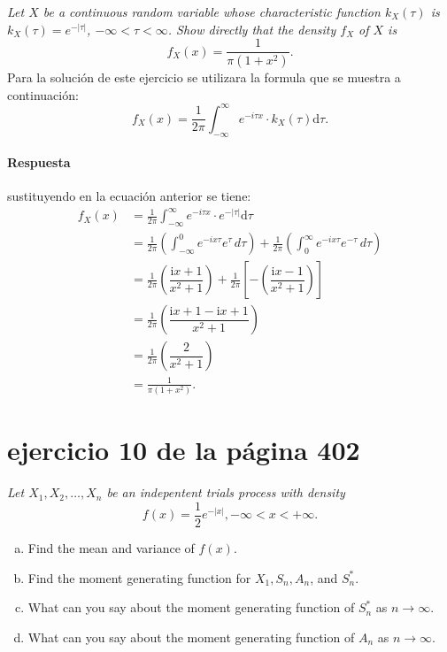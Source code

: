 \documentclass{article}
\begin{document}
\textit{Let $X$ be a continuous random variable whose characteristic function $k_X (\tau)$ is $k_X(\tau) = e^{-|\tau|}$, $-\infty < \tau < \infty$. Show directly that the density $f_X$ of $X$ is}
  \begin{equation*}
      f_X(x) = \frac{1}{\pi (1+x^2)}.
  \end{equation*}
Para la solución de este ejercicio se utilizara la formula que se muestra a continuación:
  \begin{equation}
      f_X(x) = \frac{1}{2\pi}\displaystyle\int_{-\infty}^\infty e^{-i\tau x}\cdot k_{X}(\tau)\mathrm{d}\tau .
  \end{equation}
\paragraph{Respuesta}  sustituyendo en la ecuación anterior se tiene: 
  \begin{align}
      f_X(x) &= \frac{1}{2\pi}\displaystyle\int_{-\infty}^\infty e^{-i\tau x}\cdot e^{-|\tau|}\mathrm{d}\tau \\ 
             &=\frac{1}{2\pi} \left( \int_{-\infty}^{0}e^{-ix\tau} e^{\tau}\, d\tau \right) + \frac{1}{2\pi} \left( \int_{0}^{\infty}e^{-ix\tau} e^{-\tau}\, d\tau \right)  \\
            &= \frac{1}{2\pi} \left(\dfrac{\mathrm{i}x+1}{x^2+1}\right)+\frac{1}{2\pi}\left[- \left(\dfrac{\mathrm{i}x-1}{x^2+1}\right)\right]\\
            &=\frac{1}{2\pi}\left( \dfrac{\mathrm{i}x+1 -\mathrm{i}x +1}{x^2+1} \right)\\
            &= \frac{1}{2\pi}\left( \dfrac{2}{x^2+1} \right)\\
            &= \frac{1}{\pi (1+x^2)}.
  \end{align}

\section{ejercicio 10 de la página 402}

  \textit{Let $X_1, X_2, \ldots, X_n$ be an indepentent trials process with density}
  \begin{equation*}
    f(x) = \frac{1}{2} e^{-|x|}, -\infty < x < + \infty.
  \end{equation*}
  \begin{enumerate}[a)]
    \item Find the mean and variance of $f(x)$.
    \item Find the moment generating function for $X_1, S_n, A_n$, and $S_n^*$.
    \item What can you say about the moment generating function of $S_n^*$ as $n \rightarrow \infty$.
    \item What can you say about the moment generating function of $A_n$ as $n \rightarrow \infty$.
  \end{enumerate}
\end{document}
